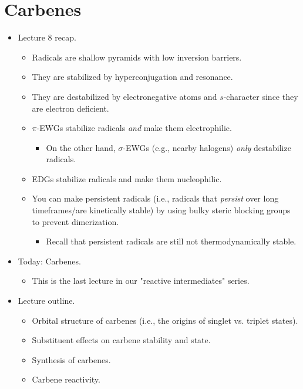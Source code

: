 \documentclass[../notes.tex]{subfiles}
\begin{document}
\section{Carbenes}
\begin{itemize}
    \item {}Lecture 8 recap.
    \begin{itemize}
        \item Radicals are shallow pyramids with low inversion barriers.
        \item They are stabilized by hyperconjugation and resonance.
        \item They are destabilized by electronegative atoms and $s$-character since they are electron deficient.
        \item $\pi$-EWGs stabilize radicals \emph{and} make them electrophilic.
        \begin{itemize}
            \item On the other hand, $\sigma$-EWGs (e.g., nearby halogens) \emph{only} destabilize radicals.
        \end{itemize}
        \item EDGs stabilize radicals and make them nucleophilic.
        \item You can make persistent radicals (i.e., radicals that \emph{persist} over long timeframes/are kinetically stable) by using bulky steric blocking groups to prevent dimerization.
        \begin{itemize}
            \item Recall that persistent radicals are still not thermodynamically stable.
        \end{itemize}
    \end{itemize}
    \item Today: Carbenes.
    \begin{itemize}
        \item This is the last lecture in our "reactive intermediates" series.
    \end{itemize}
    \item Lecture outline.
    \begin{itemize}
        \item Orbital structure of carbenes (i.e., the origins of singlet vs. triplet states).
        \item Substituent effects on carbene stability and state.
        \item Synthesis of carbenes.
        \item Carbene reactivity.

\end{itemize}
\end{itemize}
\end{document}
